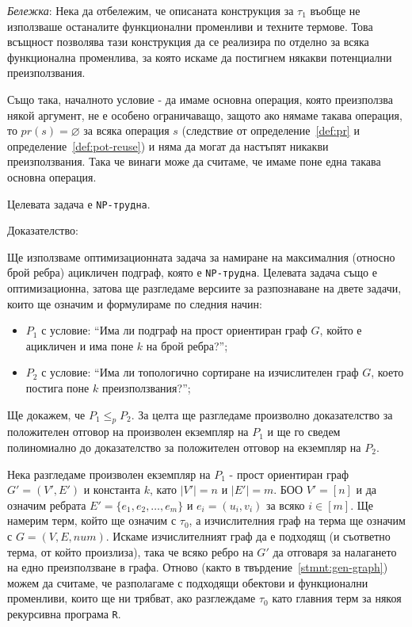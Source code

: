 \documentclass[12pt,twoside,a4paper]{article}
\begin{document}
\begin{statement}
		\textit{Бележка}: Нека да отбележим, че описаната конструкция за $\tau_1$ въобще не използваше останалите функционални променливи и техните термове. Това всъщност позволява тази конструкция да се реализира по отделно за всяка функционална променлива, за която искаме да постигнем някакви потенциални преизползвания.
		
		Също така, началното условие - да имаме основна операция, която преизползва някой аргумент, не е особено ограничаващо, защото ако нямаме такава операция, то $pr(s) = \varnothing$ за всяка операция $s$ (следствие от определение~\ref{def:pr} и определение~\ref{def:pot-reuse}) и няма да могат да настъпят никакви преизползвания. Така че винаги може да считаме, че имаме поне една такава основна операция.
	\end{statement}
	
	\begin{theorem} Целевата задача е \texttt{NP-трудна}.
		
		\noindent Доказателство:
		
		Ще използваме оптимизационната задача за намиране на максималния (относно брой ребра) ацикличен подграф, която е \texttt{NP-трудна}. Целевата задача също е оптимизационна, затова ще разгледаме версиите за разпознаване на двете задачи, които ще означим и формулираме по следния начин:
		\begin{itemize}
			\item $P_1$ с условие: "`Има ли подграф на прост ориентиран граф $G$, който е ацикличен и има поне $k$ на брой ребра?"';
			\item $P_2$ с условие: "`Има ли топологично сортиране на изчислителен граф $G$, което постига поне $k$ преизползвания?"';
		\end{itemize}
		
		Ще докажем, че $P_1 \le_p P_2$. За целта ще разгледаме произволно доказателство за положителен отговор на произволен екземпляр на $P_1$ и ще го сведем полиномиално до доказателство за положителен отговор на екземпляр на $P_2$.
		
		Нека разгледаме произволен екземпляр на $P_1$ - прост ориентиран граф $G'=(V',E')$ и константа $k$, като $|V'|=n$ и $|E'|=m$. БОО $V'=[n]$ и да означим ребрата $E'=\{e_1, e_2, \dots, e_m\}$ и $e_i = (u_i, v_i)$ за всяко $i \in [m]$. Ще намерим терм, който ще означим с $\tau_0$, а изчислителния граф на терма ще означим с $G=(V,E,num)$. Искаме изчислителният граф да е подходящ (и съответно терма, от който произлиза), така че всяко ребро на $G'$ да отговаря за налагането на едно преизползване в графа. Отново (както в твърдение~\ref{stmnt:gen-graph}) можем да считаме, че разполагаме с подходящи обектови и функционални променливи, които ще ни трябват, ако разглеждаме $\tau_0$ като главния терм за някоя рекурсивна програма \texttt{R}.
		

\end{theorem}
\end{document}
